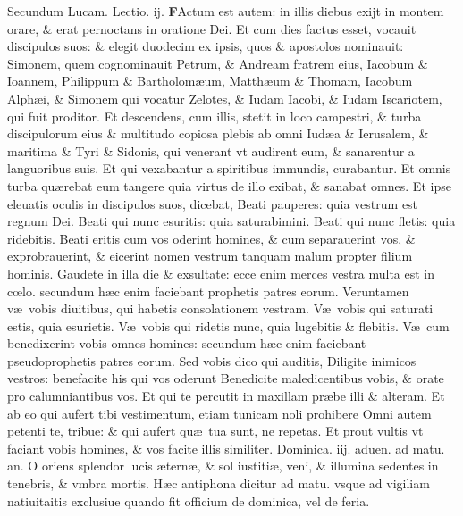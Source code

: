 \documentclass[a5paper,10pt]{book}
\def\rightmarginnote{%
	\lrmarginnote{\hskip\columnwidth \hskip -1em}}
\def\ae{æ}
\def\oe{œ}
\begin{document}
\begin{multicols*}{2}
\newline \color{red} Secundum Lucam. \hfill Lectio. ij. \color{black}
\vspace{-.25em}
\lettrine[lines=2]{\bfseries \color{red} F}{}Actum\rightmarginnote{ca. 6.} est autem: in illis diebus exijt in montem orare, \& erat pernoctans in oratione Dei.
Et cum dies factus esset, vocauit discipulos suos: \& elegit duodecim ex ipsis, quos \& apostolos nominauit: Simonem, quem cognominauit Petrum, \& Andream fratrem eius, Iacobum \& Ioannem, Philippum \& Bartholom\ae um, Matth\ae um \& Thomam, Iacobum Alph\ae i, \& Simonem qui vocatur Zelotes, \& Iudam Iacobi, \& Iudam Iscariotem, qui fuit proditor.
Et descendens, cum illis, stetit in loco campestri, \& turba discipulorum eius \& multitudo copiosa plebis ab omni Iud\ae a \& Ierusalem, \& maritima \& Tyri \& Sidonis, qui venerant vt audirent eum, \& sanarentur a languoribus suis.
Et qui vexabantur a spiritibus immundis, curabantur. Et omnis turba qu\ae rebat eum tangere quia virtus de illo exibat, \& sanabat omnes.
Et ipse eleuatis oculis in discipulos suos, dicebat, Beati pauperes: quia vestrum est regnum Dei.
Beati qui nunc esuritis: quia saturabimini.
Beati qui nunc fletis: quia ridebitis.
Beati eritis cum vos oderint homines, \& cum separauerint vos, \& exprobrauerint, \& eicerint nomen vestrum tanquam malum propter filium hominis.
Gaudete in illa die \& exsultate: ecce enim merces vestra multa est in c\oe lo. secundum h\ae c enim faciebant prophetis patres eorum.
Veruntamen v\ae \ vobis diuitibus,
qui habetis consolationem vestram.
V\ae \ vobis qui saturati estis, quia esurietis.
V\ae \ vobis qui ridetis nunc, quia lugebitis \& flebitis.
V\ae \ cum benedixerint vobis omnes homines: secundum h\ae c enim faciebant pseudoprophetis patres eorum.
Sed vobis dico qui auditis, Diligite inimicos vestros: benefacite his qui vos oderunt Benedicite maledicentibus vobis, \& orate pro calumniantibus vos.
Et qui te percutit in maxillam pr\ae be illi \& alteram.
Et ab eo qui aufert tibi vestimentum, etiam tunicam noli prohibere Omni autem petenti te, tribue: \& qui aufert qu\ae \ tua sunt, ne repetas.
Et prout vultis vt faciant vobis homines, \& vos facite illis similiter.
\newline {} \color{red} \hypertarget{SUN-TERTIA-ADV}{Dominica. iij. aduen.} ad matu. an. \color{black} O oriens splendor lucis \ae tern\ae , \& sol iustiti\ae , veni, \& illumina sedentes in tenebris, \& vmbra mortis.
\newline \color{red} H\ae c antiphona dicitur ad matu. vsque ad vigiliam natiuitaitis exclusiue quando fit officium de dominica, vel de feria. \color{black}

\end{multicols*}
\end{document}
